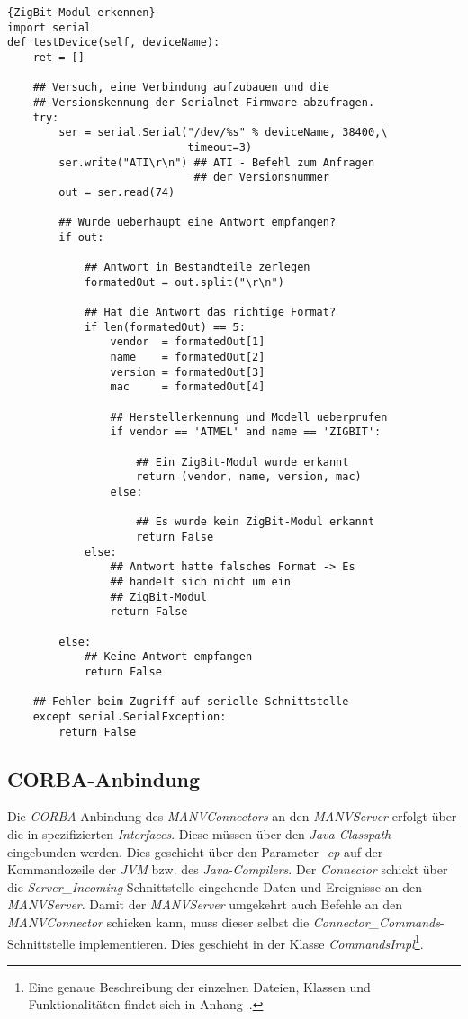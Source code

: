 \begin{lstlisting}{ZigBit-Modul erkennen}
import serial
def testDevice(self, deviceName):
    ret = []

    ## Versuch, eine Verbindung aufzubauen und die 
    ## Versionskennung der Serialnet-Firmware abzufragen. 
    try:
        ser = serial.Serial("/dev/%s" % deviceName, 38400,\
                            timeout=3)
        ser.write("ATI\r\n") ## ATI - Befehl zum Anfragen
                             ## der Versionsnummer
        out = ser.read(74)
        
        ## Wurde ueberhaupt eine Antwort empfangen? 
        if out:

            ## Antwort in Bestandteile zerlegen
            formatedOut = out.split("\r\n")

            ## Hat die Antwort das richtige Format?
            if len(formatedOut) == 5:
                vendor  = formatedOut[1]
                name    = formatedOut[2]
                version = formatedOut[3]
                mac     = formatedOut[4]

                ## Herstellerkennung und Modell ueberprufen
                if vendor == 'ATMEL' and name == 'ZIGBIT':

                    ## Ein ZigBit-Modul wurde erkannt
                    return (vendor, name, version, mac)
                else:

                    ## Es wurde kein ZigBit-Modul erkannt
                    return False
            else:
                ## Antwort hatte falsches Format -> Es 
                ## handelt sich nicht um ein 
                ## ZigBit-Modul
                return False

        else:
            ## Keine Antwort empfangen
            return False

    ## Fehler beim Zugriff auf serielle Schnittstelle
    except serial.SerialException:
        return False
\end{lstlisting}

\subsection{CORBA-Anbindung}
Die \emph{CORBA}-Anbindung des \emph{MANVConnectors} an den \emph{MANVServer} erfolgt über
die in \cite{Jan} spezifizierten \emph{Interfaces}. Diese müssen über den \emph{Java Classpath}
eingebunden werden. Dies geschieht über den Parameter \emph{-cp} auf der Kommandozeile
der \emph{JVM} bzw. des \emph{Java-Compilers}. Der \emph{Connector} schickt über die 
\emph{Server\_Incoming}-Schnittstelle eingehende Daten und Ereignisse an den \emph{MANVServer}.
Damit der \emph{MANV\-Server} umgekehrt auch Befehle an den \emph{MANVConnector} schicken kann,
muss dieser selbst die \emph{Connector\_Commands}-Schnittstelle implementieren. Dies
geschieht in der Klasse \emph{CommandsImpl}\footnote{Eine
genaue Beschreibung der einzelnen Dateien, Klassen und Funktionalitäten findet sich in
Anhang~\label{anhang_beschreibung_software}.}.\\

